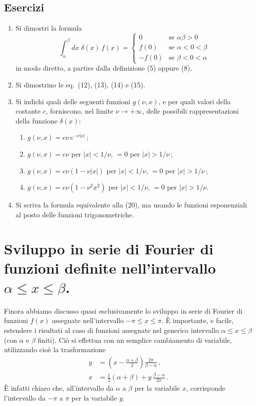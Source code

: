 \documentclass[11pt, a4paper]{book}
\numberwithin{equation}{section}
\newenvironment{esercizi}{\subsection*{Esercizi}\begin{enumerate}}{\end{enumerate}}
\begin{document}
\begin{esercizi}
\item Si dimostri la formula
\[
  \int_\alpha^\beta dx\;\delta(x)\,f(x) =
  \begin{cases}
    0 & \text{se } \alpha\beta > 0 \\
    f(0) & \text{se } \alpha < 0 < \beta \\
    -f(0) & \text{se } \beta < 0 < \alpha
  \end{cases}
\]
in modo diretto, a partire dalla definizione (5) oppure (8).

\item Si dimostrino le eq.\ (12), (13), (14) e (15).

\item Si indichi quali delle seguenti funzioni $g(\nu,x)$, e per quali valori della costante $c$, forniscono, nel limite $\nu\to+\infty$, delle possibili rappresentazioni della funzione $\delta(x)$:
\begin{enumerate}
  \item $g(\nu,x) = c\nu\,e^{-\nu|x|}$\,;
  \item $g(\nu,x) = c\nu$ per $|x|<1/\nu$, $= 0$ per $|x|>1/\nu$\,;
  \item $g(\nu,x) = c\nu(1-\nu|x|)$ per $|x|<1/\nu$, $= 0$ per $|x|>1/\nu$\,;
  \item $g(\nu,x) = c\nu(1-\nu^2 x^2)$ per $|x|<1/\nu$, $= 0$ per $|x|>1/\nu$.
\end{enumerate}

\item Si scriva la formula equivalente alla (20), ma usando le funzioni esponenziali al posto delle funzioni trigonometriche.
\end{esercizi}

\section{Sviluppo in serie di Fourier di funzioni definite nell'intervallo $\alpha \leq x \leq \beta$.}

Finora abbiamo discusso quasi esclusivamente lo sviluppo in serie di Fourier di funzioni $f(x)$ assegnate nell'intervallo $-\pi \leq x \leq \pi$. È importante, e facile, estendere i risultati al caso di funzioni assegnate nel generico intervallo $\alpha \leq x \leq \beta$ (con $\alpha$ e $\beta$ finiti). Ciò si effettua con un semplice cambiamento di variabile, utilizzando cioè la trasformazione
\begin{align}
  y &= \left(x-\frac{\alpha+\beta}{2}\right)\frac{2\pi}{\beta-\alpha}\,, \tag{1a}\\
  x &= \frac{1}{2}(\alpha+\beta) + y\,\frac{\beta-\alpha}{2\pi}\,. \tag{1b}
\end{align}
È infatti chiaro che, all'intervallo da $\alpha$ a $\beta$ per la variabile $x$, corrisponde l'intervallo da $-\pi$ a $\pi$ per la variabile $y$.
\end{document}
